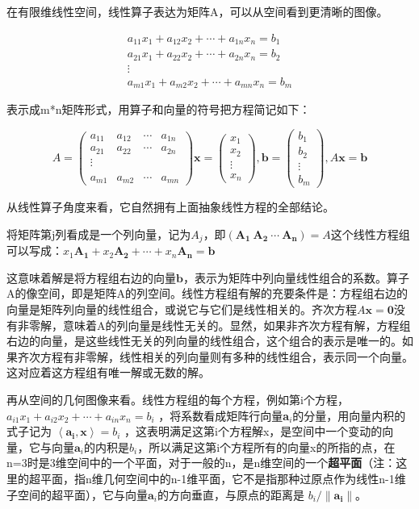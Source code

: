 在有限维线性空间，线性算子表达为矩阵A，可以从空间看到更清晰的图像。

\[\begin{matrix} a_{11}x_1+a_{12}x_2+\cdots+a_{1n}x_n=b_1 \\ a_{21}x_1+a_{22}x_2+\cdots+a_{2n}x_n=b_2 \\ \vdots\\  a_{m1}x_1+a_{m2}x_2+\cdots +a_{mn}x_n=b_m\end{matrix}\]

表示成m*n矩阵形式，用算子和向量的符号把方程简记如下：

\[A=\begin{pmatrix}a_{11}& a_{12}&\cdots& a_{1n} \\ a_{21}& a_{22}&\cdots& a_{2n} \\ \vdots\\ \\a_{m1}& a_{m2} &\cdots& a_{mn}  \end{pmatrix} \textbf{x}= \begin{pmatrix}x_1 \\x_2 \\ \vdots \\x_n \end{pmatrix},  \textbf{b}= \begin{pmatrix}b_1 \\b_2 \\ \vdots \\b_m \end{pmatrix},A\textbf{x}=\textbf{b}\]

从线性算子角度来看，它自然拥有上面抽象线性方程的全部结论。

将矩阵第j列看成是一个列向量，记为$ A_j $，即$ (\mathbf{A_1}\ \mathbf{A_2}\  \cdots \  \mathbf{A_n}) = A $这个线性方程组可以写成：$ x_1\mathbf{A_1}+x_2\mathbf{A_2}+\cdots+x_n\mathbf{A_n}=\mathbf{b} $

这意味着解是将方程组右边的向量$ \mathbf{b} $，表示为矩阵中列向量线性组合的系数。算子A的像空间，即是矩阵A的列空间。线性方程组有解的充要条件是：方程组右边的向量是矩阵列向量的线性组合，或说它与它们是线性相关的。齐次方程$ A\mathbf{x}=\mathbf{0} $没有非零解，意味着A的列向量是线性无关的。显然，如果非齐次方程有解，方程组右边的向量，是这些线性无关的列向量的线性组合，这个组合的表示是唯一的。如果齐次方程有非零解，线性相关的列向量则有多种的线性组合，表示同一个向量。这对应着这方程组有唯一解或无数的解。

再从空间的几何图像来看。线性方程组的每个方程，例如第i个方程，$ a_{i1}x_1+a_{i2}x_2+\cdots +a_{in}x_n =b_i $ ，将系数看成矩阵行向量\textbf{a}$ _i $的分量，用向量内积的式子记为 $ \left \langle \mathbf{a_i}, \mathbf{x} \right \rangle=b_i $ ，这表明满足这第i个方程解x，是空间中一个变动的向量，它与向量$ \mathbf{a}_i $的内积是$ b_i $，所以满足这第i个方程所有的向量x的所指的点，在n=3时是3维空间中的一个平面，对于一般的n，是n维空间的一个\textbf{超平面}（注：这里的超平面，指n维几何空间中的n-1维平面，它不是指那种过原点作为线性n-1维子空间的超平面），它与向量$ \mathbf{a}_i $的方向垂直，与原点的距离是 $ b_i/\|\mathbf{a_i}\| $。

